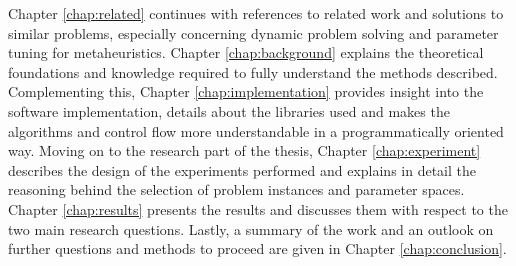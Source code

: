 Chapter \ref{chap:related} continues with references to related work and solutions to similar problems, especially concerning dynamic problem solving and parameter tuning for metaheuristics.
Chapter \ref{chap:background} explains the theoretical foundations and knowledge required to fully understand the methods described.
Complementing this, Chapter \ref{chap:implementation} provides insight into the software implementation, details about the libraries used and makes the algorithms and control flow more understandable in a programmatically oriented way.
Moving on to the research part of the thesis, Chapter \ref{chap:experiment} describes the design of the experiments performed and explains in detail the reasoning behind the selection of problem instances and parameter spaces.
Chapter \ref{chap:results} presents the results and discusses them with respect to the two main research questions.
Lastly, a summary of the work and an outlook on further questions and methods to proceed are given in Chapter \ref{chap:conclusion}.






